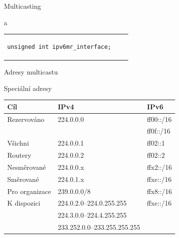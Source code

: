 \begin{frame}[fragile]{Multicasting}
\begin{block}{ a }
\begin{tabular}{lp{2em}l}
\begin{lstlisting}[aboveskip=2pt,belowskip=2pt,showlines]
unsigned int ipv6mr_interface;
  \end{lstlisting}
  \end{tabular}
  \end{block}

\end{frame}

\begin{frame}{Adresy multicastu}

  \begin{block}{Speciální adresy}
    \begin{center}
      \begin{tabular}{|l|l|l|} \hline
    \textbf{Cíl} & \textbf{IPv4} & \textbf{IPv6} \\ \hline
    Rezervováno	   & 224.0.0.0 & ff00::/16 \\
		   & 	       & ff0f::/16 \\ \hline
    Všichni	   & 224.0.0.1 & ff02::1 \\ \hline
    Routery	   & 224.0.0.2 & ff02::2 \\ \hline
    Nesměrované	   & 224.0.0.x & ffx2::/16 \\ \hline
    Směrované	   & 224.0.1.x & ffxe::/16 \\ \hline
    Pro organizace & 239.0.0.0/8 & ffx8::/16 \\ \hline
    K dispozici    & 224.0.2.0--224.0.255.255 & ffxe::/16 \\
		   & 224.3.0.0--224.4.255.255 & \\
		   & 233.252.0.0--233.255.255.255 & \\ \hline
      \end{tabular}
    \end{center}
  \end{block}

\end{frame}


